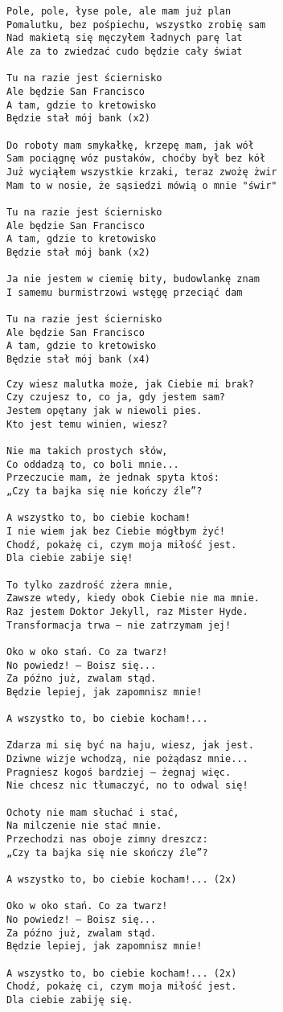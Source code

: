 \documentclass[12pt]{article}
\begin{document}
\begin{verbatim}
Pole, pole, łyse pole, ale mam już plan
Pomalutku, bez pośpiechu, wszystko zrobię sam
Nad makietą się męczyłem ładnych parę lat
Ale za to zwiedzać cudo będzie cały świat

Tu na razie jest ściernisko
Ale będzie San Francisco
A tam, gdzie to kretowisko
Będzie stał mój bank (x2)

Do roboty mam smykałkę, krzepę mam, jak wół
Sam pociągnę wóz pustaków, choćby był bez kół
Już wyciąłem wszystkie krzaki, teraz zwożę żwir
Mam to w nosie, że sąsiedzi mówią o mnie "świr"

Tu na razie jest ściernisko
Ale będzie San Francisco
A tam, gdzie to kretowisko
Będzie stał mój bank (x2)

Ja nie jestem w ciemię bity, budowlankę znam
I samemu burmistrzowi wstęgę przeciąć dam

Tu na razie jest ściernisko
Ale będzie San Francisco
A tam, gdzie to kretowisko
Będzie stał mój bank (x4)
\end{verbatim}
\clearpage

\begin{verbatim}
Czy wiesz malutka może, jak Ciebie mi brak?
Czy czujesz to, co ja, gdy jestem sam?
Jestem opętany jak w niewoli pies.
Kto jest temu winien, wiesz?

Nie ma takich prostych słów,
Co oddadzą to, co boli mnie...
Przeczucie mam, że jednak spyta ktoś:
„Czy ta bajka się nie kończy źle”?

A wszystko to, bo ciebie kocham!
I nie wiem jak bez Ciebie mógłbym żyć!
Chodź, pokażę ci, czym moja miłość jest.
Dla ciebie zabije się!

To tylko zazdrość zżera mnie,
Zawsze wtedy, kiedy obok Ciebie nie ma mnie.
Raz jestem Doktor Jekyll, raz Mister Hyde.
Transformacja trwa – nie zatrzymam jej!

Oko w oko stań. Co za twarz!
No powiedz! – Boisz się...
Za późno już, zwalam stąd.
Będzie lepiej, jak zapomnisz mnie!

A wszystko to, bo ciebie kocham!...

Zdarza mi się być na haju, wiesz, jak jest.
Dziwne wizje wchodzą, nie pożądasz mnie...
Pragniesz kogoś bardziej – żegnaj więc.
Nie chcesz nic tłumaczyć, no to odwal się!

Ochoty nie mam słuchać i stać,
Na milczenie nie stać mnie.
Przechodzi nas oboje zimny dreszcz:
„Czy ta bajka się nie skończy źle”?

A wszystko to, bo ciebie kocham!... (2x)

Oko w oko stań. Co za twarz!
No powiedz! – Boisz się...
Za późno już, zwalam stąd.
Będzie lepiej, jak zapomnisz mnie!

A wszystko to, bo ciebie kocham!... (2x)
Chodź, pokażę ci, czym moja miłość jest.
Dla ciebie zabiję się.
\end{verbatim}
\clearpage
\end{document}
